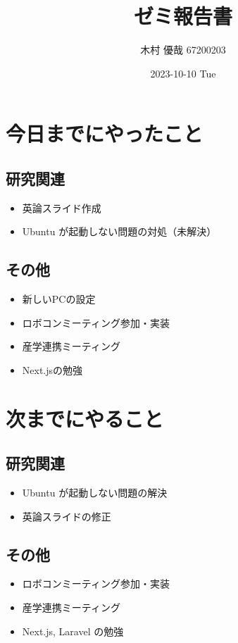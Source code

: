 \documentclass[uplatex, onecolumn, 10pt]{jsarticle}
\begin{document}
\title{\vspace{-40mm}\bf{\LARGE{ゼミ報告書}}}
\author{\vspace{-40mm}木村 優哉 67200203}
\date{2023-10-10 Tue}
\maketitle


\section{今日までにやったこと}

\subsection*{研究関連}
\begin{itemize}
	\item 英論スライド作成
	\item Ubuntu が起動しない問題の対処（未解決）
\end{itemize}

\subsection*{その他}
\begin{itemize}
	\item 新しいPCの設定
	\item ロボコンミーティング参加・実装
	\item 産学連携ミーティング
	\item Next.jsの勉強
\end{itemize}


\section{次までにやること}

\subsection*{研究関連}
\begin{itemize}
	\item Ubuntu が起動しない問題の解決
	\item 英論スライドの修正
\end{itemize}

\subsection*{その他}
\begin{itemize}
	\item ロボコンミーティング参加・実装
	\item 産学連携ミーティング
	\item Next.js, Laravel の勉強
\end{itemize}
\end{document}

